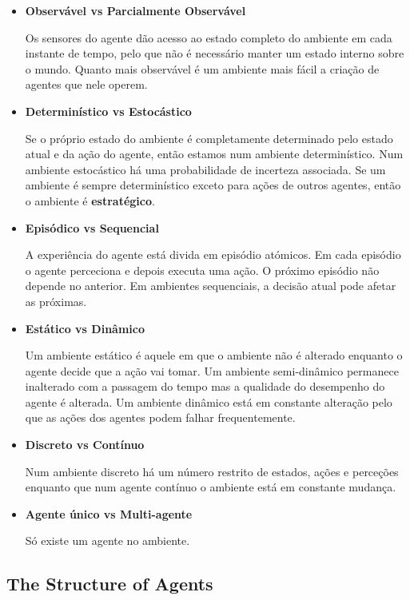 \documentclass[11pt]{article}
\begin{document}
\begin{itemize}
    \item \textbf{Observável vs Parcialmente Observável}

    Os sensores do agente dão acesso ao estado completo do ambiente em cada instante de tempo, pelo que não é necessário manter um estado interno sobre o mundo. Quanto mais observável é um ambiente mais fácil a criação de agentes que nele operem.

    \item \textbf{Determinístico vs Estocástico}

    Se o próprio estado do ambiente é completamente determinado pelo estado atual e da ação do agente, então estamos num ambiente determinístico. Num ambiente estocástico há uma probabilidade de incerteza associada. Se um ambiente é sempre determinístico exceto para ações de outros agentes, então o ambiente é \textbf{estratégico}.

    \item \textbf{Episódico vs Sequencial}
    
    A experiência do agente está divida em episódio atómicos. Em cada episódio o agente perceciona e depois executa uma ação. O próximo episódio não depende no anterior. Em ambientes sequenciais, a decisão atual pode afetar as próximas.
    
    \item \textbf{Estático vs Dinâmico}
    
    Um ambiente estático é aquele em que o ambiente não é alterado enquanto o agente decide que a ação vai tomar. Um ambiente semi-dinâmico permanece inalterado com a passagem do tempo mas a qualidade do desempenho do agente é alterada. Um ambiente dinâmico está em constante alteração pelo que as ações dos agentes podem falhar frequentemente.
    
    \item \textbf{Discreto vs Contínuo}

    Num ambiente discreto há um número restrito de estados, ações e perceções enquanto que num agente contínuo o ambiente está em constante mudança.

    \item \textbf{Agente único vs Multi-agente}
    
    Só existe um agente no ambiente.
\end{itemize}

\subsection{The Structure of Agents}
\end{document}
